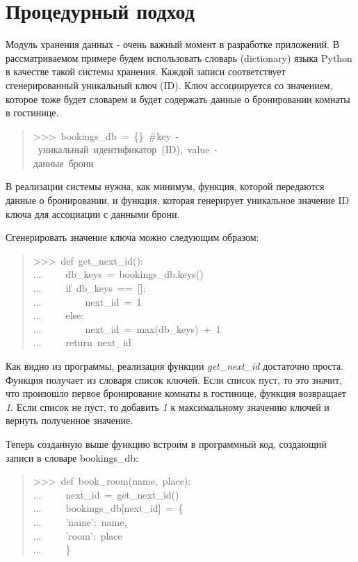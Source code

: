 \documentclass[14pt,a4paper,openany,twoside,final]{extbook}
\providecommand*{\DUroletitlereference}[1]{\textsl{#1}}
\begin{document}
\section{Процедурный подход%
  \label{id19}%
}

Модуль хранения данных - очень важный момент в разработке приложений.
В рассматриваемом примере будем использовать словарь (dictionary)
языка Python в качестве такой системы хранения.  Каждой записи
соответствует сгенерированный уникальный ключ (ID).  Ключ
ассоциируется со значением, которое тоже будет словарем и будет
содержать данные о бронировании комнаты в гостинице.

\begin{quote}{\ttfamily \raggedright \noindent
>{}>{}>~bookings\_db~=~\{\}~\#key~-~уникальный~идентификатор~(ID),~value~-\\
данные~брони
}
\end{quote}

В реализации системы нужна, как минимум, функция, которой передаются
данные о бронировании, и функция, которая генерирует уникальное
значение ID ключа для ассоциации с данными брони.

Сгенерировать значение ключа можно следующим образом:

\begin{quote}{\ttfamily \raggedright \noindent
>{}>{}>~def~get\_next\_id():\\
...~~~~~db\_keys~=~bookings\_db.keys()\\
...~~~~~if~db\_keys~==~{[}{]}:\\
...~~~~~~~~~next\_id~=~1\\
...~~~~~else:\\
...~~~~~~~~~next\_id~=~max(db\_keys)~+~1\\
...~~~~~return~next\_id
}
\end{quote}

Как видно из программы, реализация функции \DUroletitlereference{get\_next\_id} достаточно
проста.  Функция получает из словаря список ключей. Если список пуст,
то это значит, что произошло первое бронирование комнаты в гостинице,
функция возвращает \DUroletitlereference{1}.  Если список не пуст, то добавить \DUroletitlereference{1} к
максимальному значению ключей и вернуть полученное значение.

Теперь созданную выше функцию встроим в программный код, создающий
записи в словаре bookings\_db:

\begin{quote}{\ttfamily \raggedright \noindent
>{}>{}>~def~book\_room(name,~place):\\
...~~~~~next\_id~=~get\_next\_id()\\
...~~~~~bookings\_db{[}next\_id{]}~=~\{\\
...~~~~~'name':~name,\\
...~~~~~'room':~place\\
...~~~~~\}
}
\end{quote}
\end{document}
